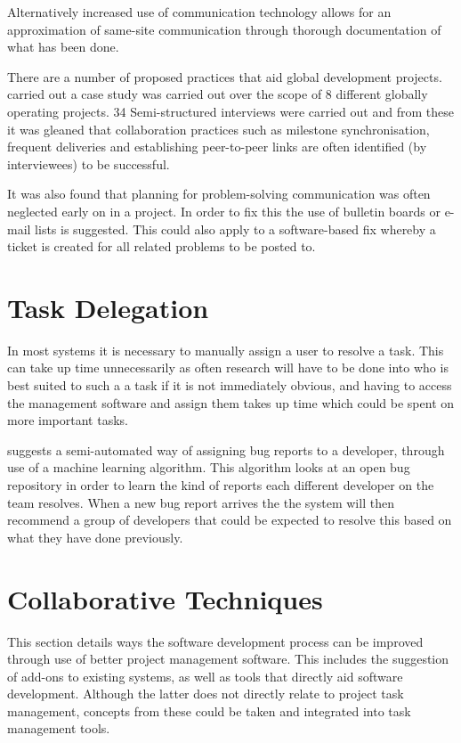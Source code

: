 \documentclass{l4proj}
\begin{document}
Alternatively increased use of communication technology allows for an approximation of same-site communication through thorough documentation of what has been done.

There are a number of proposed practices that aid global development projects.  \citet{paasivaara03collaboration} carried out a case study was carried out over the scope of 8 different globally operating projects.  34 Semi-structured interviews were carried out and from these it was gleaned that collaboration practices such as milestone synchronisation, frequent deliveries and establishing peer-to-peer links are often identified (by interviewees) to be successful. 

It was also found that planning for problem-solving communication was often neglected early on in a project.  In order to fix this the use of bulletin boards or e-mail lists is suggested.  This could also apply to a software-based fix whereby a ticket is created for all related problems to be posted to.

\section {Task Delegation}

In most systems it is necessary to manually assign a user to resolve a task.  This can take up time unnecessarily as often research will have to be done into who is best suited to such a a task if it is not immediately obvious, and having to access the management software and assign them takes up time which could be spent on more important tasks.

 
\citet{anvik06who} suggests a semi-automated way of assigning bug reports to a developer, through use of a machine learning algorithm.  This algorithm looks at an open bug repository in order to learn the kind of reports each different developer on the team resolves.  When a new bug report arrives the the system will then recommend a group of developers that could be expected to resolve this based on what they have done previously.
\section {Collaborative Techniques}

This section details ways the software development process can be improved through use of better project management software.  This includes the suggestion of add-ons to existing systems, as well as tools that directly aid software development. Although the latter does not directly relate to project task management, concepts from these could be taken and integrated into task management tools.
\end{document}
